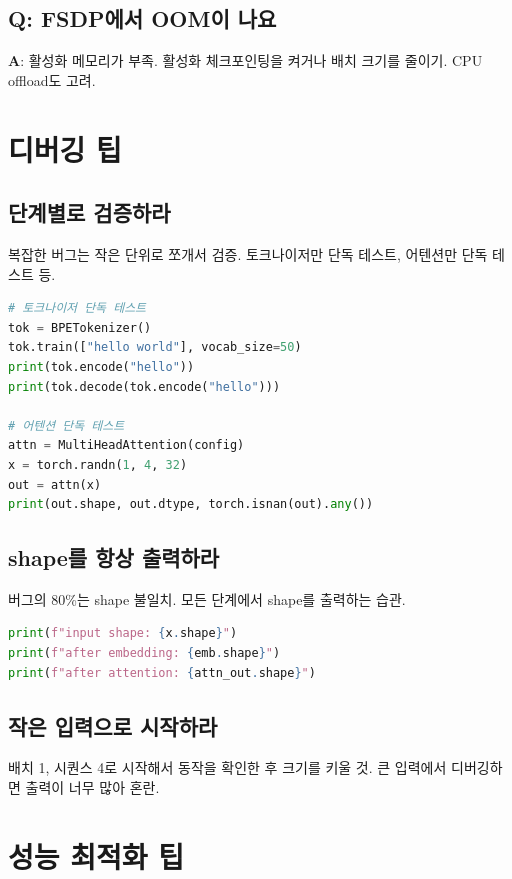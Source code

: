 \subsection{Q: FSDP에서 OOM이 나요}

\textbf{A}: 활성화 메모리가 부족. 활성화 체크포인팅을 켜거나 배치 크기를 줄이기. CPU offload도 고려.

\section{디버깅 팁}

\subsection{단계별로 검증하라}

복잡한 버그는 작은 단위로 쪼개서 검증. 토크나이저만 단독 테스트, 어텐션만 단독 테스트 등.

\begin{lstlisting}[language=Python]
# 토크나이저 단독 테스트
tok = BPETokenizer()
tok.train(["hello world"], vocab_size=50)
print(tok.encode("hello"))
print(tok.decode(tok.encode("hello")))

# 어텐션 단독 테스트
attn = MultiHeadAttention(config)
x = torch.randn(1, 4, 32)
out = attn(x)
print(out.shape, out.dtype, torch.isnan(out).any())
\end{lstlisting}

\subsection{shape를 항상 출력하라}

버그의 80\%는 shape 불일치. 모든 단계에서 shape를 출력하는 습관.

\begin{lstlisting}[language=Python]
print(f"input shape: {x.shape}")
print(f"after embedding: {emb.shape}")
print(f"after attention: {attn_out.shape}")
\end{lstlisting}

\subsection{작은 입력으로 시작하라}

배치 1, 시퀀스 4로 시작해서 동작을 확인한 후 크기를 키울 것. 큰 입력에서 디버깅하면 출력이 너무 많아 혼란.

\section{성능 최적화 팁}

